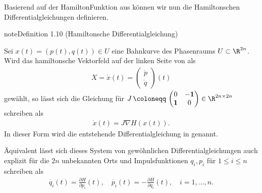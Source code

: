 \documentclass[letterpaper,10pt,english]{jupyterBook}
\begin{document}
\sphinxAtStartPar
Basierend auf der Hamilton\sphinxhyphen{}Funktion aus {\hyperref[\detokenize{ode/hamilton:def:hamiltonsch}]{}} können wir nun die Hamiltonschen Differentialgleichungen definieren.
\label{ode/hamilton:definition-2}
\begin{sphinxadmonition}{note}{Definition 1.10 (Hamiltonsche Differentialgleichung)}



\sphinxAtStartPar
Sei \(x(t) = (p(t),q(t)) \in U\) eine Bahnkurve des Phasenraums \(U \subset \R^{2n}\).
Wird das hamiltonsche Vektorfeld auf der linken Seite von {\hyperref[\detokenize{ode/hamilton:equation-eq-hamilton-gleichung}]{}} als
\begin{equation*}
\begin{split}X = \dot{x}(t) = \begin{pmatrix} \dot{p} \\ \dot{q} \end{pmatrix} (t)\end{split}
\end{equation*}
\sphinxAtStartPar
gewählt, so lässt sich die Gleichung für \(J \, \coloneqq \, \begin{pmatrix}0 & -\mathbf{1}\\ \mathbf{1} & 0 \end{pmatrix} \in \R^{2n \times 2n}\) schreiben als
\begin{equation}\label{equation:ode/hamilton:eq:hamilton_DGL}
\begin{split}\dot{x}(t) = J \nabla H(x(t)).\end{split}
\end{equation}
\sphinxAtStartPar
In dieser Form wird die entstehende Differentialgleichung in {\hyperref[\detokenize{ode/hamilton:equation-eq-hamilton-dgl}]{}}  genannt.

\sphinxAtStartPar
Äquivalent lässt sich dieses System von gewöhnlichen Differentialgleichungen auch explizit für die \(2n\) unbekannten Orts\sphinxhyphen{} und Impulsfunktionen \(q_i, p_i\) für \(1 \leq i \leq n\) schreiben als
\begin{equation*}
\begin{split}\dot{q_i}(t) = \frac{\partial H}{\partial p_i}(t), \quad \dot{p_i}(t) = -\frac{\partial H}{\partial q_i}(t), \quad i=1,\ldots,n.\end{split}
\end{equation*}\end{sphinxadmonition}
\end{document}
